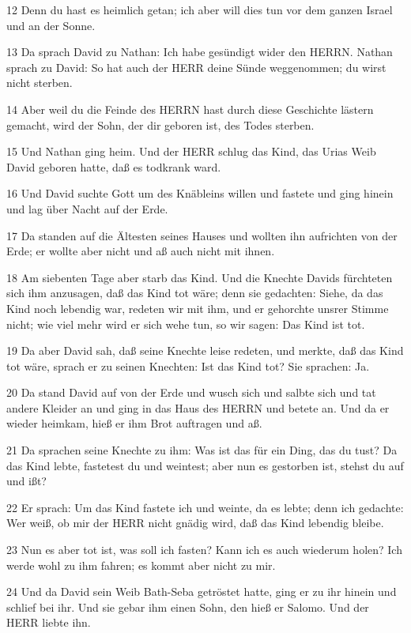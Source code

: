 \par 12 Denn du hast es heimlich getan; ich aber will dies tun vor dem ganzen Israel und an der Sonne.
\par 13 Da sprach David zu Nathan: Ich habe gesündigt wider den HERRN. Nathan sprach zu David: So hat auch der HERR deine Sünde weggenommen; du wirst nicht sterben.
\par 14 Aber weil du die Feinde des HERRN hast durch diese Geschichte lästern gemacht, wird der Sohn, der dir geboren ist, des Todes sterben.
\par 15 Und Nathan ging heim. Und der HERR schlug das Kind, das Urias Weib David geboren hatte, daß es todkrank ward.
\par 16 Und David suchte Gott um des Knäbleins willen und fastete und ging hinein und lag über Nacht auf der Erde.
\par 17 Da standen auf die Ältesten seines Hauses und wollten ihn aufrichten von der Erde; er wollte aber nicht und aß auch nicht mit ihnen.
\par 18 Am siebenten Tage aber starb das Kind. Und die Knechte Davids fürchteten sich ihm anzusagen, daß das Kind tot wäre; denn sie gedachten: Siehe, da das Kind noch lebendig war, redeten wir mit ihm, und er gehorchte unsrer Stimme nicht; wie viel mehr wird er sich wehe tun, so wir sagen: Das Kind ist tot.
\par 19 Da aber David sah, daß seine Knechte leise redeten, und merkte, daß das Kind tot wäre, sprach er zu seinen Knechten: Ist das Kind tot? Sie sprachen: Ja.
\par 20 Da stand David auf von der Erde und wusch sich und salbte sich und tat andere Kleider an und ging in das Haus des HERRN und betete an. Und da er wieder heimkam, hieß er ihm Brot auftragen und aß.
\par 21 Da sprachen seine Knechte zu ihm: Was ist das für ein Ding, das du tust? Da das Kind lebte, fastetest du und weintest; aber nun es gestorben ist, stehst du auf und ißt?
\par 22 Er sprach: Um das Kind fastete ich und weinte, da es lebte; denn ich gedachte: Wer weiß, ob mir der HERR nicht gnädig wird, daß das Kind lebendig bleibe.
\par 23 Nun es aber tot ist, was soll ich fasten? Kann ich es auch wiederum holen? Ich werde wohl zu ihm fahren; es kommt aber nicht zu mir.
\par 24 Und da David sein Weib Bath-Seba getröstet hatte, ging er zu ihr hinein und schlief bei ihr. Und sie gebar ihm einen Sohn, den hieß er Salomo. Und der HERR liebte ihn.
